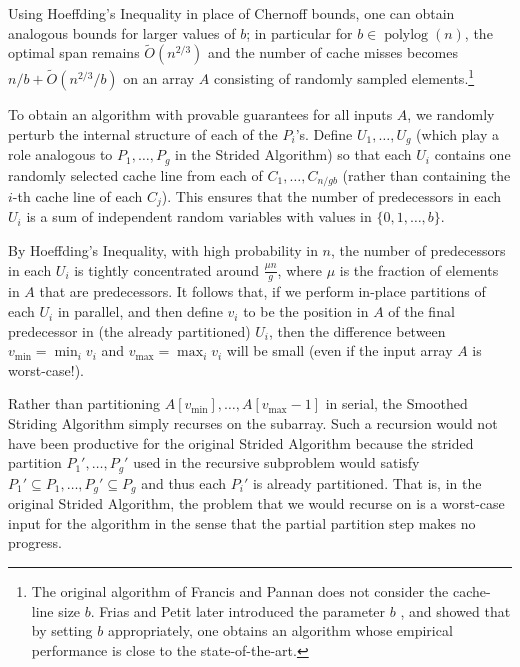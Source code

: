 \documentclass[11pt]{article}
\renewcommand{\paragraph}[1]{\vspace{0.09in}\noindent{\bf \boldmath #1.}}
\theoremstyle{remark}
\theoremstyle{remark}
\begin{document}
Using Hoeffding's Inequality in place of Chernoff bounds, one can
obtain analogous bounds for larger values of $b$; in particular for $b
\in \operatorname{polylog}(n)$, the optimal span remains
$\tilde{O}(n^{2/3})$ and the number of cache misses becomes $n / b +
\tilde{O}(n^{2/3} / b)$ on an array $A$ consisting of randomly sampled
elements.\footnote{The original algorithm of Francis and Pannan
  \cite{FrancisPa92} does not consider the cache-line size $b$. Frias
  and Petit later introduced the parameter $b$ \cite{Frias08}, and
  showed that by setting $b$ appropriately, one obtains an algorithm
  whose empirical performance is close to the state-of-the-art.}



\paragraph{The Smoothed Striding Algorithm}
To obtain an algorithm with provable guarantees for all inputs $A$, we
randomly perturb the internal structure of each of the $P_i$'s. Define
$U_1, \ldots, U_{g}$ (which play a role analogous to $P_1,
\ldots, P_g$ in the Strided Algorithm) so that each $U_i$ contains one
randomly selected cache line from each of $C_1, \ldots, C_{n /
  gb}$ (rather than containing the $i$-th cache line of each
$C_j$). This ensures that the number of predecessors in each $U_i$ is
a sum of independent random variables with values in $\{0, 1, \ldots,
b\}$.


By Hoeffding's Inequality, with high probability in $n$, the number of
predecessors in each $U_i$ is tightly concentrated around $\frac{\mu
  n}{g}$, where $\mu$ is the fraction of elements in $A$ that are
predecessors. It follows that, if we perform in-place partitions of
each $U_i$ in parallel, and then define $v_i$ to be the position in
$A$ of the final predecessor in (the already partitioned) $U_i$, then
the difference between $v_{\text{min}} = \min_i v_i$ and
$v_{\text{max}} = \max_i v_i$ will be small (even if the input array
$A$ is worst-case!).

Rather than partitioning $A[v_{\text{min}}],\ldots,
A[v_{\text{max}}-1]$ in serial, the Smoothed Striding Algorithm simply
recurses on the subarray. Such a recursion would not have been
productive for the original Strided Algorithm because the strided
partition $P_1', \ldots, P_g'$ used in the recursive subproblem would
satisfy $P_1' \subseteq P_1, \ldots, P_g' \subseteq P_g$ and thus each
$P_i'$ is already partitioned. That is, in the original Strided
Algorithm, the problem that we would recurse on is a worst-case input
for the algorithm in the sense that the partial partition step makes
no progress.
\end{document}
